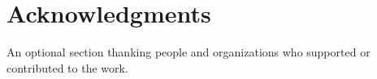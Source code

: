 \chapter*{Acknowledgments}
\label{acknowledgments}

An optional section thanking people and organizations who supported or contributed to the work.
